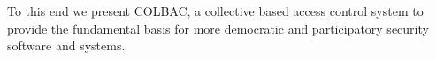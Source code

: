 To this end we present COLBAC, a collective based access control system to
provide the fundamental basis for more democratic and participatory security
software and systems.

%





